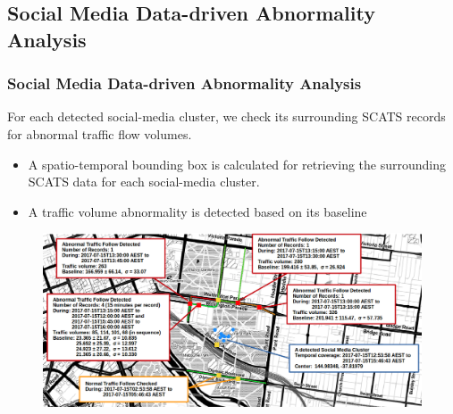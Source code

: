\subsection{Social Media Data-driven Abnormality Analysis}
\begin{frame}
    \frametitle{Social Media Data-driven Abnormality Analysis}
	 For each detected social-media cluster, we check its surrounding SCATS records for abnormal traffic flow volumes. 
	 \begin{itemize} \small
	       \item A spatio-temporal bounding box is calculated for retrieving the surrounding SCATS data for each social-media cluster.
	        \item A traffic volume abnormality is detected based on its baseline
	 \end{itemize}
	 \vspace{-0.15cm}
	 \begin{figure}
    	\centering
        \includegraphics[width=.9\textwidth]{resource/figures/casestudy2_exp.png}
    \end{figure}
\end{frame}

